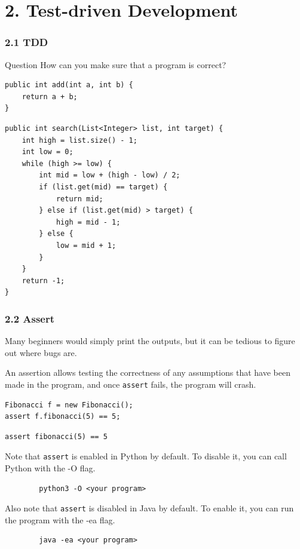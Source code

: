 \documentclass[aspectratio=169, 14pt]{beamer}
\begin{document}
\section{\textcolor{darkmidnightblue}{2. Test-driven Development}}
\begin{frame}[fragile]
    \frametitle{2.1 TDD}
    \begin{exampleblock}{Question}
    How can you make sure that a program is correct?
    \end{exampleblock}
    \begin{verbatim}
public int add(int a, int b) {
    return a + b;
} 
    \end{verbatim} 
\end{frame}

\begin{frame}[fragile]
    \begin{verbatim}
public int search(List<Integer> list, int target) {
    int high = list.size() - 1;
    int low = 0;
    while (high >= low) {
        int mid = low + (high - low) / 2;
        if (list.get(mid) == target) {
            return mid;
        } else if (list.get(mid) > target) {
            high = mid - 1;
        } else {
            low = mid + 1;
        }
    }
    return -1;
}
    \end{verbatim} 
\end{frame}

\begin{frame}[fragile]
    \frametitle{2.2 Assert}
    Many beginners would simply print the outputs, but it can be tedious to figure out where bugs are.

\pause
An \alert{assertion} allows testing the correctness of any assumptions that have been made in the program, and once \texttt{assert} fails, the program will crash. 

\begin{verbatim}
Fibonacci f = new Fibonacci();
assert f.fibonacci(5) == 5;
\end{verbatim}

\begin{verbatim}
assert fibonacci(5) == 5
\end{verbatim}

\end{frame}

\begin{frame}[fragile=singleslide]
    Note that \texttt{assert} is enabled in Python by default. To disable it, you can call Python with the \alert{-O} flag.

    \begin{verbatim}
        python3 -O <your program>
    \end{verbatim}

    Also note that \texttt{assert} is disabled in Java by default. To enable it, you can run the program with the \alert{-ea} flag.

    \begin{verbatim}
        java -ea <your program>
    \end{verbatim} 
\end{frame}
\end{document}
